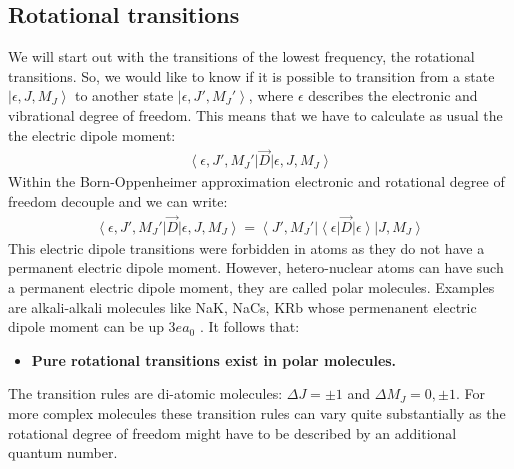 \documentclass[10pt]{article}
\let\cite\citep
\providecommand\citep{\cite}
\newcommand{\bra}[1]{\ensuremath{\left\langle#1\right|}}
\newcommand{\ket}[1]{\ensuremath{\left|#1\right\rangle}}
\begin{document}
\subsection{Rotational transitions}
We will start out with the transitions of the lowest frequency, the rotational transitions. So, we would like to know if it is possible to transition from a state $\ket{\epsilon, J, M_J}$ to another state $\ket{\epsilon, J', M_J'}$, where $\epsilon$ describes the electronic and vibrational degree of freedom. This means that we have to calculate as usual the the electric dipole moment:
\begin{align}
\bra{\epsilon, J', M_J'} \vec{D}\ket{\epsilon, J, M_J}
\end{align}
Within the Born-Oppenheimer approximation electronic and rotational degree of freedom decouple and we can write: 
\begin{align}
\bra{\epsilon, J', M_J'} \vec{D}\ket{\epsilon, J, M_J} = \bra{J', M_J'} \bra{\epsilon}\vec{D}\ket{\epsilon}\ket{ J, M_J}
\end{align}
This electric dipole transitions were forbidden in atoms as they do not have a permanent electric dipole moment. However, hetero-nuclear atoms can have such a permanent electric dipole moment, they are called polar molecules. Examples are alkali-alkali molecules like NaK, NaCs, KRb whose permenanent electric dipole moment can be up $3 ea_0$ \cite{Qu_m_ner_2012}. It follows that:
\begin{itemize}
\item \textbf{Pure rotational transitions exist in polar molecules.}
\end{itemize}
The transition rules are di-atomic molecules: $\Delta J = \pm 1$ and $\Delta M_J= 0, \pm1$. For more complex molecules these transition rules can vary quite substantially as the rotational degree of freedom might have to be described by an additional quantum number.
\end{document}
